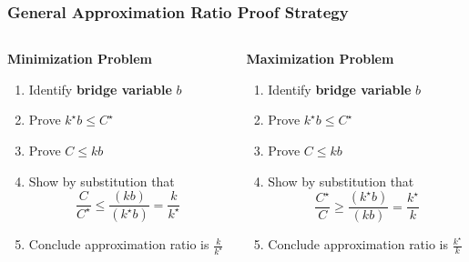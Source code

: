 \documentclass[10pt,aspectratio=169]{beamer}
\begin{document}
\begin{frame} \frametitle{General Approximation Ratio Proof Strategy}
\begin{columns}
\begin{column}{0.5\textwidth}
  
  \begin{center}
  \textbf{Minimization Problem}
  \end{center}
  
  \begin{enumerate}
    \item Identify \textbf{bridge variable} $b$
    \item Prove $k^\star b \leq C^\star$
    \item Prove $C \leq k b$
    \item Show by substitution that
      \[ \frac{C}{C^\star} \leq \frac{(k b)}{(k^\star b)} = \frac{k}{k^\star} \]
    \item Conclude approximation ratio is $\frac{k}{k^\star}$
  \end{enumerate}

\end{column}
\begin{column}{0.5\textwidth}
  
  \begin{center}
  \textbf{Maximization Problem}
  \end{center}

  \begin{enumerate}
    \item Identify \textbf{bridge variable} $b$
    \item Prove $k^\star b \leq C^\star$
    \item Prove $C \leq k b$
    \item Show by substitution that
      \[ \frac{C^\star}{C} \geq \frac{(k^\star b)}{(k b)} = \frac{k^\star}{k} \]
    \item Conclude approximation ratio is $\frac{k^\star}{k}$
  \end{enumerate}

\end{column}
\end{columns}
\end{frame}
\end{document}
